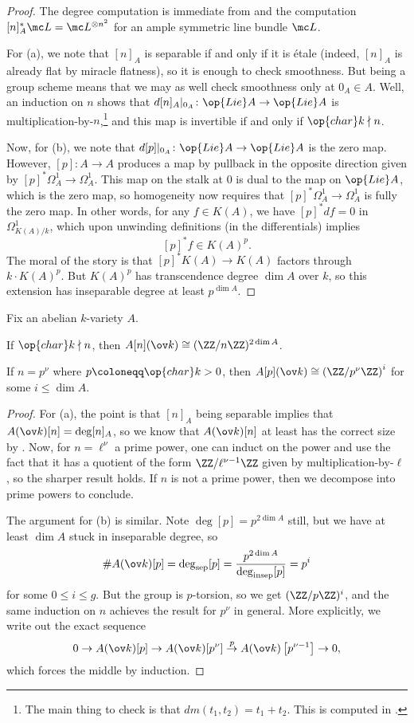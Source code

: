 \documentclass[../notes.tex]{subfiles}
\begin{document}
\begin{proof}
	The degree computation is immediate from  and the computation $[n]_A^*\mc L=\mc L^{\otimes n^2}$ for an ample symmetric line bundle $\mc L$.

	For (a), we note that $[n]_A$ is separable if and only if it is \'etale (indeed, $[n]_A$ is already flat by miracle flatness), so it is enough to check smoothness. But being a group scheme means that we may as well check smoothness only at $0_A\in A$. Well, an induction on $n$ shows that $d[n]_A|_{0_A}\colon\op{Lie}A\to\op{Lie}A$ is multiplication-by-$n$,\footnote{The main thing to check is that $dm(t_1,t_2)=t_1+t_2$. This is computed in \cite[p.~40]{mumford}.} and this map is invertible if and only if $\op{char}k\nmid n$.

	Now, for (b), we note that $d[p]|_{0_A}\colon\op{Lie}A\to\op{Lie}A$ is the zero map. However, $[p]\colon A\to A$ produces a map by pullback in the opposite direction given by $[p]^*\Omega^1_A\to\Omega^1_A$. This map on the stalk at $0$ is dual to the map on $\op{Lie}A$, which is the zero map, so homogeneity now requires that $[p]^*\Omega^1_A\to\Omega^1_A$ is fully the zero map. In other words, for any $f\in K(A)$, we have $[p]^*df=0$ in $\Omega^1_{K(A)/k}$, which upon unwinding definitions (in the differentials) implies
	\[[p]^*f\in K(A)^p.\]
	The moral of the story is that $[p]^*K(A)\to K(A)$ factors through $k\cdot K(A)^p$. But $K(A)^p$ has transcendence degree $\dim A$ over $k$, so this extension has inseparable degree at least $p^{\dim A}$.
\end{proof}
\begin{corollary} \label{cor:tors-av}
	Fix an abelian $k$-variety $A$.
	\begin{listalph}
		\item If $\op{char}k\nmid n$, then $A[n](\ov k)\cong(\ZZ/n\ZZ)^{2\dim A}$.
		\item If $n=p^\nu$ where $p\coloneqq\op{char}k>0$, then $A[p](\ov k)\cong\left(\ZZ/p^\nu\ZZ\right)^i$ for some $i\le\dim A$.
	\end{listalph}
\end{corollary}
\begin{proof}
	For (a), the point is that $[n]_A$ being separable implies that $A(\ov k)[n]=\deg[n]_A$, so we know that $A(\ov k)[n]$ at least has the correct size by . Now, for $n=\ell^\nu$ a prime power, one can induct on the power and use the fact that it has a quotient of the form $\ZZ/\ell^{\nu-1}\ZZ$ given by multiplication-by-$\ell$, so the sharper result holds. If $n$ is not a prime power, then we decompose into prime powers to conclude.
	
	The argument for (b) is similar. Note $\deg[p]=p^{2\dim A}$ still, but we have at least $\dim A$ stuck in inseparable degree, so
	\[\#A(\ov k)[p]=\deg_{\mathrm{sep}}[p]=\frac{p^{2\dim A}}{\deg_{\mathrm{insep}}[p]}=p^i\]
	for some $0\le i\le g$. But the group is $p$-torsion, so we get $(\ZZ/p\ZZ)^i$, and the same induction on $n$ achieves the result for $p^\nu$ in general. More explicitly, we write out the exact sequence
	\[0\to A(\ov k)[p]\to A(\ov k)[p^\nu]\stackrel p\to A(\ov k)\left[p^{\nu-1}\right]\to0,\]
	which forces the middle by induction.
\end{proof}
\end{document}

